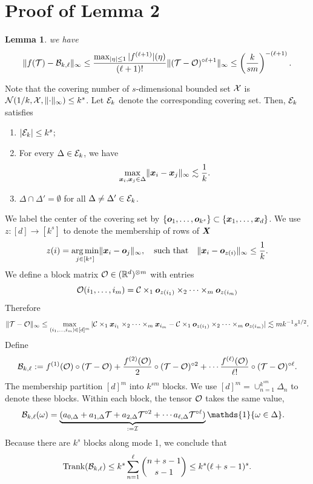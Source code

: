 \documentclass[11pt]{article}
\theoremstyle{plain}
\newtheorem{lem}{Lemma}
\theoremstyle{definition}
\newcommand*{\KeepStyleUnderBrace}[1]{%
  \mathop{%
    \mathchoice
    {\underbrace{\displaystyle#1}}%
    {\underbrace{\textstyle#1}}%
    {\underbrace{\scriptstyle#1}}%
    {\underbrace{\scriptscriptstyle#1}}%
  }\limits
}
\def\rank{\textup{Trank}}
\def\Mat{\textup{Mat}}
\begin{document}
\section{Proof of Lemma 2}
\begin{lem} we have
\[
\lVert f(\mathcal{T})-\mathcal{B}_{k,\ell}\rVert_\infty\leq {\max_{|\eta|\leq 1}|f^{(\ell+1)}|(\eta)\over (\ell+1)!}\lVert(\mathcal{T}-\mathcal{O})^{\circ {\ell+1}}\rVert_\infty\leq \left({k\over sm}\right)^{-(\ell+1)}. 
\]
\end{lem}
Note that the covering number of $s$-dimensional bounded set $\mathcal{X}$ is $\mathcal{N}(1/k, \mathcal{X}, \lVert\cdot\rVert_\infty)\leq k^s$. Let $\mathcal{E}_k$ denote the corresponding covering set. Then,  $\mathcal{E}_k$ satisfies 
\begin{enumerate} 
\item $|\mathcal{E}_k| \leq k^s$;
\item For every $\Delta \in\mathcal{E}_k$, we have
\[
 \max_{\bm x_i,\bm x_j\in \Delta}\lVert\bm x_i-\bm x_j\rVert_\infty\lesssim {1\over k}.
\]
\item $\Delta \cap \Delta'=\emptyset$ for all $\Delta\neq \Delta'\in\mathcal{E}_k$.
\end{enumerate}
We label the center of the covering set by $\{\bm{o}_1,\ldots,\bm{o}_{k^s}\} \subset\{\bm x_1,\ldots,\bm x_d\}$. We use $z\colon [d]\to[k^s]$ to denote the membership of rows of $\bm X$
\[
z(i)=\operatorname*{arg\,min}_{j\in[k^s]}\lVert\bm x_i - \bm{o}_j\rVert_\infty, \quad\text{such that}\quad \lVert\bm x_i-\bm{o}_{z(i)}\rVert_\infty\leq {1\over k}.
\]
We define a block matrix $\mathcal{O}\in(\mathbb{R}^{d})^{\otimes m}$ with entries
\[
\mathcal{O}(i_1,\ldots,i_m)=\mathcal{C}\times_1\bm{o}_{z(i_1)}\times_2\cdots\times_m \bm{o}_{z(i_m)} 
\]
Therefore
\[
\lVert\mathcal{T}-\mathcal{O}\rVert_\infty\leq \max_{(i_1,\ldots,i_m)\in[d]^m} |\mathcal{C}\times_1 \bm x_{i_1}\times_2\cdots \times_m \bm x_{i_m}-\mathcal{C}\times_1 \bm{o}_{z(i_1)}\times_2\cdots \times_m \bm{o}_{z(i_m)}|\lesssim mk^{-1}s^{1/2}.
\]
Define 
\[
\mathcal{B}_{k,\ell}:=f^{(1)}(\mathcal{O})\circ (\mathcal{T}-\mathcal{O})+{f^{(2)}(\mathcal{O})\over 2}\circ (\mathcal{T}-\mathcal{O})^{\circ 2}+\cdots {f^{(\ell)}(\mathcal{O})\over \ell!} \circ (\mathcal{T}-\mathcal{O})^{\circ \ell}.
\]
The membership partition $[d]^m$ into $k^{sm}$ blocks. We use $[d]^m=\cup_{n=1}^{k^{sm}}\Delta_n$ to denote these blocks. Within each block, the tensor $\mathcal{O}$ takes the same value, 
\begin{align}
\tB_{k,\ell}(\omega)&=\KeepStyleUnderBrace{(a_{0,\Delta}+a_{1,\Delta}\tT+a_{2,\Delta}\tT^{\circ 2}+\cdots a_{\ell,\Delta} \tT^{\circ \ell})}_{:=\tI}\mathds{1}\{\omega\in \Delta \}.
\end{align}
Because there are $k^{s}$ blocks along mode 1, we conclude that
\[
\rank(\tB_{k,\ell})\leq k^{s} \sum_{n=1}^\ell{n+s-1 \choose s-1} \leq k^{s}(\ell+s-1)^s.
\]
\end{document}
